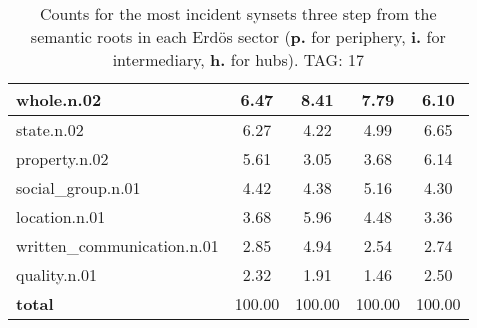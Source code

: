 \begin{table}[h!]
\begin{center}
\begin{tabular}{| l || c | c | c | c |}
whole.n.02 & 6.47  & 8.41  & 7.79  & 6.10 \\\hline
state.n.02 & 6.27  & 4.22  & 4.99  & 6.65 \\\hline
property.n.02 & 5.61  & 3.05  & 3.68  & 6.14 \\\hline
social\_group.n.01 & 4.42  & 4.38  & 5.16  & 4.30 \\\hline
location.n.01 & 3.68  & 5.96  & 4.48  & 3.36 \\\hline
written\_communication.n.01 & 2.85  & 4.94  & 2.54  & 2.74 \\\hline
quality.n.01 & 2.32  & 1.91  & 1.46  & 2.50 \\\hline\hline
{{\bf total}} & 100.00  & 100.00  & 100.00  & 100.00 \\\hline
\end{tabular}
\caption{Counts for the most incident synsets three step from the semantic roots in each Erd\"os sector ({\bf p.} for periphery, {\bf i.} for intermediary, {\bf h.} for hubs). TAG: 17}
\end{center}
\end{table}